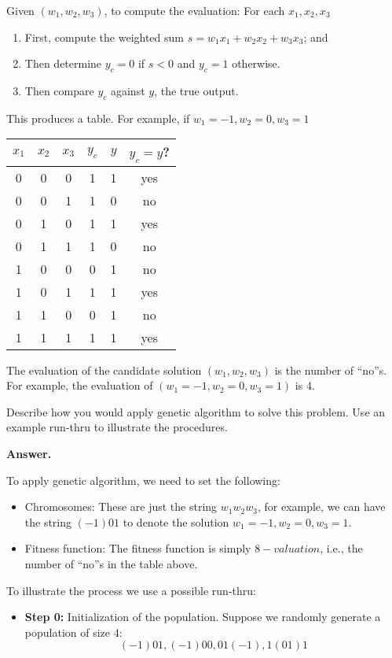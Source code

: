 \documentclass[12pt]{article}
\begin{document}
\begin{Q}
\medskip

Given $(w_1,w_2,w_3)$, to compute the evaluation: For each $x_1,x_2,x_3$
\begin{enumerate}
\item First, compute the weighted sum $s=w_1x_1+w_2x_2+w_3x_3$; and
\item Then determine $y_c=0$ if $s<0$ and $y_c=1$ otherwise.
\item Then compare $y_c$ against $y$, the true output.
\end{enumerate}
This produces a table. For example, if $w_1=-1,w_2=0,w_3=1$

\begin{table}[H]\centering
\begin{tabular}{ccccc|c}
$x_1$&$x_2$&$x_3$& $y_c$ & $y$ & $y_c=y$?\\ \hline
0&0&0&1&1& yes \\
0&0&1&1&0& no\\
0&1&0&1&1& yes\\
0&1&1&1&0& no\\
1&0&0&0&1& no\\
1&0&1&1&1& yes\\
1&1&0&0&1& no\\
1&1&1&1&1& yes
\end{tabular}
\end{table}
The evaluation of the candidate solution $(w_1,w_2,w_3)$ is the number of ``no''s. For example, the evaluation of $(w_1=-1,w_2=0,w_3=1)$ is 4.

Describe how you would apply genetic algorithm to solve this problem. Use an example run-thru to illustrate the procedures.

\medskip

{\bf Answer.}


To apply genetic algorithm, we need to set the following:
\begin{itemize}
\item Chromosomes: These are just the string $w_1w_2w_3$, for example, we can have the string $(-1)01$ to denote the solution $w_1=-1,w_2=0,w_3=1$.
\item Fitness function: The fitness function is simply $8-valuation$, i.e., the number of ``no''s in the table above.
\end{itemize}
To illustrate the process we use a possible run-thru:
\begin{itemize}
\item \textbf{Step 0:} Initialization of the population. Suppose we randomly generate a population of size 4:
\[
    (-1)01, (-1)00, 01(-1), 1(01)1
\]


\end{itemize}
\end{Q}
\end{document}
